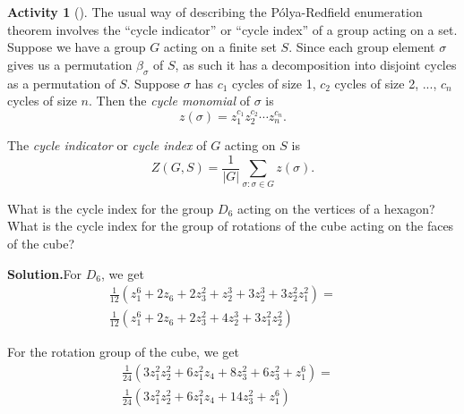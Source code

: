\documentclass[10pt,]{book}
\theoremstyle{plain}
\theoremstyle{definition}
\newtheorem{activity}[project]{Activity}
\numberwithin{equation}{chapter}
\newcommand{\amp}{&}
\begin{document}
\begin{activity}[]\label{activity-312}
The usual way of describing the Pólya-Redfield enumeration theorem involves the ``cycle indicator'' or ``cycle index'' of a group acting on a set. Suppose we have a group \(G\) acting on a finite set \(S\). Since each group element \(\sigma\) gives us a permutation \(\beta_{\sigma}\) of \(S\), as such it has a decomposition into disjoint cycles as a permutation of \(S\). Suppose \(\sigma\) has \(c_1\) cycles of size 1, \(c_2\) cycles of size 2, ..., \(c_n\) cycles of size \(n\). Then the \emph{cycle monomial} of \(\sigma\) is%
\begin{equation*}
z(\sigma) = z_1^{c_1}z_2^{c_2}\cdots z_n^{c_n}.
\end{equation*}
%
\par
The \emph{cycle indicator} or \emph{cycle index} of \(G\) acting on \(S\) is%
\begin{equation*}
Z(G,S) = \frac{1}{|G|}\sum_{\sigma: \sigma \in G} z(\sigma).
\end{equation*}
%
\par
What is the cycle index for the group \(D_6\) acting on the vertices of a hexagon? What is the cycle index for the group of rotations of the cube acting on the faces of the cube?%
\par\medskip\noindent%
\textbf{Solution.}\quad For \(D_6\), we get%
\begin{align*}
\frac{1}{12}\left(z_1^6
+2z_6+2z_3^2+z_2^3+3z_2^3+3z_2^2z_1^2\right)  =\amp\\
\frac{1}{12}\left(z_1^6
+2z_6+2z_3^2+4z_2^3+3z_1^2z_2^2\right)\amp \amp
\end{align*}
%
\par
For the rotation group of the cube, we get%
\begin{align*}
\frac{1}{24}\left(3z_1^2z_2^2+ 6z_1^2z_4+8z_3^2 +6z_3^2+z_1^6\right) =\amp\\
\frac{1}{24}\left(3z_1^2z_2^2+ 6z_1^2z_4 +14z_3^2+z_1^6\right) \amp
\end{align*}
%
\end{activity}
\end{document}
